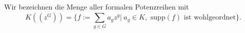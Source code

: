 %
%
%
%
%
%
Wir bezeichnen die Menge aller formalen Potenzreihen mit 
\[K\left(\left(z^{G}\right)\right) = \lbrace f := \sum_{g \in G}^{}a_g z^g |~ a_g \in K, \text{  supp}(f) \text{ ist wohlgeordnet}\rbrace.\]
%
%
